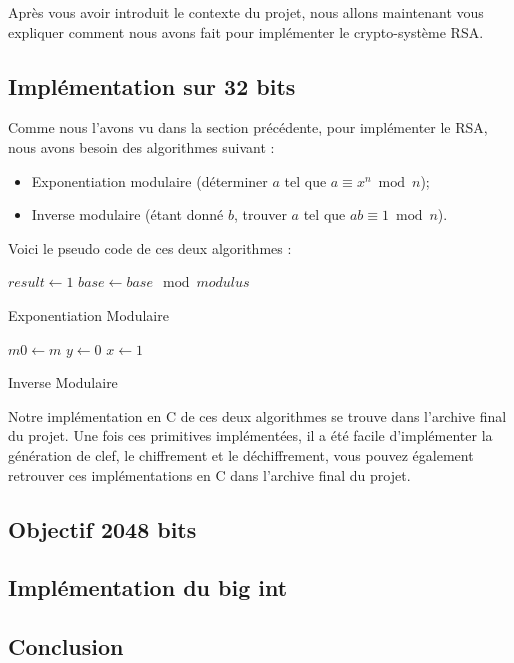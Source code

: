 Après vous avoir introduit le contexte du projet, nous allons maintenant vous expliquer comment nous avons fait pour implémenter le crypto-système RSA.

\subsection{Implémentation sur 32 bits}
Comme nous l'avons vu dans la section précédente, pour implémenter le RSA, nous avons besoin des algorithmes suivant :
\begin{itemize}
	\item Exponentiation modulaire (déterminer $a$ tel que $a \equiv x^n \bmod n$);
	\item Inverse modulaire (étant donné $b$, trouver $a$ tel que $ab \equiv 1 \bmod n$).
\end{itemize}
Voici le pseudo code de ces deux algorithmes :

\begin{algorithm}[H]
\SetAlgoLined
{}
$result \leftarrow 1$\;
$base \leftarrow base \mod modulus$\;
\;
\caption{Exponentiation Modulaire}
\end{algorithm}

\begin{algorithm}[H]
\SetAlgoLined
{}
$m0 \leftarrow m$\;
$y \leftarrow 0$\;
$x \leftarrow 1$\;
\;
\caption{Inverse Modulaire}
\end{algorithm}
Notre implémentation en C de ces deux algorithmes se trouve dans l'archive final du projet. Une fois ces primitives implémentées, il a été facile d'implémenter la génération de clef, le chiffrement et le déchiffrement, vous pouvez également retrouver ces implémentations en C dans l'archive final du projet.

\subsection{Objectif 2048 bits}
\subsection{Implémentation du big int}
\subsection{Conclusion}
